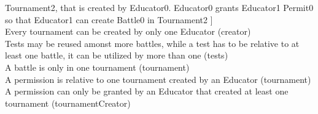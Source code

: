 \documentclass{article}
\begin{document}
{Tournament2, that is created by Educator0. Educator0 grants Educator1 Permit0 so that Educator1 can create Battle0 in Tournament2 ]\\
\color{green}
Every tournament can be created by only one Educator (creator)\\
\color{blue}
Tests may be reused amonst more battles, while a test has to be relative to at least one battle, it can be utilized by more than one (tests)\\
\color{violet}
A battle is only in one tournament (tournament)\\
\color{red}
A permission is relative to one tournament created by an Educator (tournament)\\
\color{brown}
A permission can only be granted by an Educator that created at least one tournament (tournamentCreator)\\
\color{black}

\newpage
\pagestyle{EffortSpentStyle}

}
\end{document}
